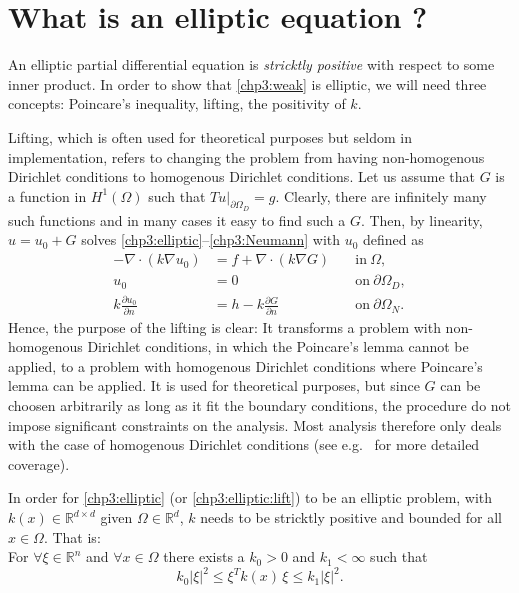 \section{What is an elliptic equation ? }

An elliptic partial differential equation is \emph{stricktly positive} with respect to some inner product. 
In order to show that \eqref{chp3:weak} is elliptic, we will need three concepts: Poincare's inequality, lifting, the positivity of $k$. 




Lifting, which is often used for theoretical purposes but seldom in implementation, 
refers to changing the problem from having non-homogenous Dirichlet conditions to homogenous Dirichlet conditions.  
Let us assume that $G$ is a function in $H^1(\Omega)$ such that $T u |_{\partial \Omega_D} = g$. 
Clearly, there are infinitely many such functions and in many cases it easy to find such a $G$. 
Then, by linearity, 
$u= u_0 + G$ solves \eqref{chp3:elliptic}--\eqref{chp3:Neumann} with $u_0$ defined as     
\begin{eqnarray}
\label{chp3:elliptic:lift}
-\nabla\cdot(k\nabla u_0 )  &= f +\nabla\cdot(k\nabla G)  &\quad \textrm{in}\ \Omega,\\
\label{chp3:Dirichlet:lift}
u_0&= 0 &\quad \textrm{on}\ \partial\Omega_D, \\
\label{chp3:Neumann:lift}
k \frac{\partial u_0}{\partial n}&= h - k \frac{\partial G}{\partial n} &\quad \textrm{on}\ \partial\Omega_N . 
\end{eqnarray}
Hence, the purpose of the lifting is clear: It transforms a problem with non-homogenous Dirichlet conditions, in which the Poincare's lemma
cannot be applied, to a problem with homogenous Dirichlet conditions where Poincare's lemma can be applied. It is used for theoretical purposes, 
but since $G$ can be choosen arbitrarily as long as it fit the boundary conditions, the procedure do not impose significant constraints on
the analysis. Most analysis therefore only deals with the case of homogenous Dirichlet conditions (see e.g.~\cite{braess2007finite} for more 
detailed coverage). 

In order for \eqref{chp3:elliptic} (or \eqref{chp3:elliptic:lift}) to be an elliptic problem, with  $k(x) \in \mathbb{R}^{d\times d}$ given $\Omega\in \mathbb{R}^d$,  
$k$ needs to be stricktly positive and bounded for all $x\in \Omega$. That is: \\  
For $\forall \xi\in \mathbb{R}^n$ and $\forall x \in \Omega$ there exists a $k_0 > 0$ and $k_1 < \infty$ such that 
\[
	k_0 |\xi|^2  \le    \xi^T k(x) \, \xi \le k_1 |\xi|^2 .   
\]

